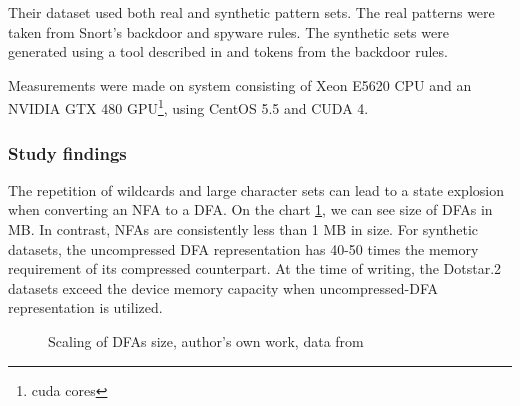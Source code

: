 \documentclass[10pt,onecolumn,twoside,english,a4paper]{article}
\begin{document}
Their dataset used both real and synthetic pattern sets. The real patterns were taken from Snort's backdoor and spyware rules. The synthetic sets were generated using a tool described in \cite{becchi2008workload} and tokens from the backdoor rules.

Measurements were made on system consisting of Xeon E5620 CPU and an NVIDIA  GTX 480 GPU\footnote{cuda cores}, using CentOS 5.5 and CUDA 4.
\subsubsection{Study findings}
The repetition of wildcards and large character sets can lead to a state explosion when converting an NFA to a DFA. On the chart \ref{dfas_size:becchi}, we can see size of DFAs in MB. In contrast, NFAs are consistently less than 1 MB in size. For synthetic datasets, the uncompressed DFA representation has 40-50 times the memory requirement of its compressed counterpart. At the time of writing, the Dotstar.2 datasets exceed the device memory capacity when uncompressed-DFA representation is utilized.
\begin{figure}[h!]
  \centering
  \caption{Scaling of DFAs size, author's own work, data from \cite{Becchi:regex_large_dataset}}
  \label{dfas_size:becchi}
\end{figure}
\end{document}

